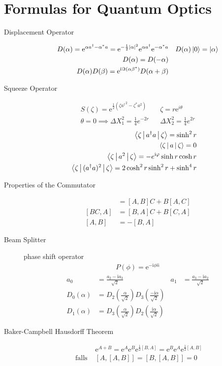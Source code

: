 \documentclass[twocolumn, 11pt]{article}
\renewcommand{\i}{\mathrm{i}}
\newcommand{\e}{\mathrm{e}}
\newcommand{\abs}[1]{\left| #1 \right|}
\begin{document}
%
\section*{Formulas for Quantum Optics}
\begin{description}
  \item[Displacement Operator]
\begin{align*}
  D(\alpha) = \e^{\alpha a^{\dagger} - \alpha ^{\ast} a} = \e^{- \frac{1}{2} \abs{\alpha}^2} \e^{\alpha a ^{\dagger}} \e^{- \alpha ^{\ast} a} && D(\alpha) \Ket{0} = \Ket{\alpha} \\
  D(\alpha) = D(-\alpha) \\
  D(\alpha) D(\beta) = \e^{\i \Im (\alpha \beta^{\ast})} D(\alpha + \beta)
\end{align*}
%
\item [Squeeze Operator] 
\begin{align*}
  S(\zeta) = \e^{\frac{1}{2} (\zeta {a^{\dagger}}^2 - \zeta^{\ast} a^2)} &&
 \zeta = r \e^{i \theta} \\
  \theta = 0 \implies \Delta X_1 ^2 = \frac{1}{4} e^{-2 r} &&  \Delta X_2 ^2 = \frac{1}{4} e^{2 r}
\end{align*}
%
%
\begin{align*}
  \Braket{\zeta | a ^{\dagger} a | \zeta} = \sinh^2 r && \\
  \Braket{\zeta | a | \zeta} = 0 && \\
  \Braket{\zeta | a^2 | \zeta} = -e ^{\i \varphi} \sinh r \cosh r && \\
  \Braket{\zeta | (a^{\dagger} a )^2 | \zeta} = 2 \cosh^2 r \sinh^2 r + \sinh^4 r
\end{align*}
%

\item[Properties of the Commutator] 
%
\begin{align*}
  [A, BC] &= [A, B] C + B [A, C] \\
  [BC, A] &= [B, A] C + B [C, A] \\
  [A, B] &= - [B, A]
\end{align*}
%
\item [Beam Splitter]
phase shift operator
%
\begin{align*}
  P(\phi) = \e^{- \i \phi \hat{n}}
\end{align*}
%
\begin{align*}
  a_0 & = \frac{a_2 - \i a_3}{\sqrt{2}} & a_1 & = \frac{a_3 - \i a_2}{\sqrt{2}} \\
  D_0(\alpha) & = D_2(\frac{\alpha}{\sqrt{2}}) D_3(\frac{- \i \alpha}{\sqrt{2}}) \\
  D_1(\alpha) & = D_3(\frac{\alpha}{\sqrt{2}}) D_2(\frac{\i \alpha}{\sqrt{2}})
\end{align*}
%
%
\item[Baker-Campbell Hausdorff Theorem] 
\begin{align*}
  & \e^{A + B}  = \e^A \e^B \e^{\frac{1}{2} [B, A]} = \e^B \e^A \e^{\frac{1}{2} [A, B]} \\
  \text{ falls } & [A, [A, B]] = [B, [A, B]] = 0
\end{align*}
%
  

\end{description}
\end{document}
